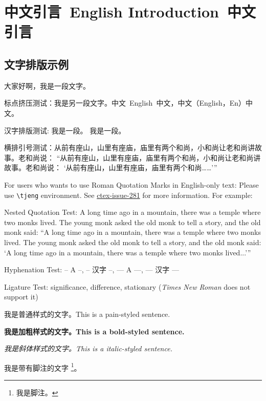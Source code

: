 \chapter{中文引言~English Introduction~中文引言}
\label{chap:intro}

\section{文字排版示例}
\label{sec:intro:typesetting}
大家好啊，我是一段文字。

标点挤压测试：我是另一段文字。中文~English~中文，中文（English，En）中文。

汉字排版测试:
我是一段。
我是一段。

横排引号测试：从前有座山，山里有座庙，庙里有两个和尚，小和尚让老和尚讲故事。老和尚说：
“从前有座山，山里有座庙，庙里有两个和尚，小和尚让老和尚讲故事。老和尚说：
‘从前有座山，山里有座庙，庙里有两个和尚……’”

For users who wants to use Roman Quotation Marks in English-only text:
Please use \verb|\tjeng| environment.
See \href{https://github.com/CTeX-org/ctex-kit/issues/389}{ctex-issue-281} for more information.
For example:

\begin{tjeng}
    Nested Quotation Test: A long time ago in a mountain, there was a temple where two monks lived.
    The young monk asked the old monk to tell a story, and the old monk said:
    “A long time ago in a mountain, there was a temple where two monks lived.
    The young monk asked the old monk to tell a story, and the old monk said:
    ‘A long time ago in a mountain, there was a temple where two monks lived...’”
\end{tjeng}

Hyphenation Test: -- A --, -- 汉字 --, --- A ---, --- 汉字 ---

Ligature Test: significance, difference, stationary (\textit{Times New Roman} does not support it)

我是普通样式的文字。This is a pain-styled sentence.

\textbf{我是加粗样式的文字。This is a bold-styled sentence.}

\textit{我是斜体样式的文字。This is a italic-styled sentence.}

我是带有脚注的文字 \footnote{我是脚注。}。

